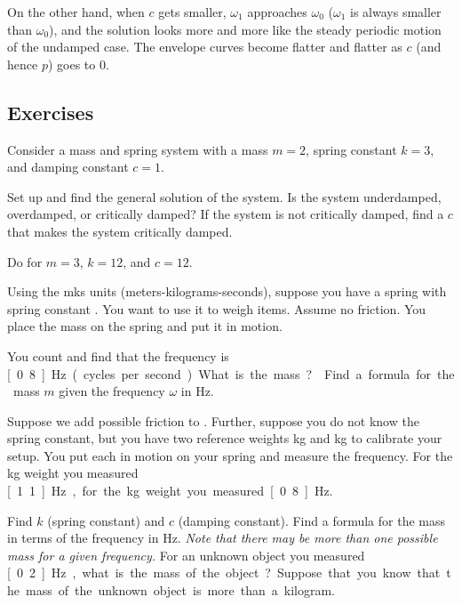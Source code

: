 On the other hand, when $c$ gets smaller, $\omega_1$ approaches $\omega_0$
($\omega_1$ is always smaller than $\omega_0$), and the solution looks more and more like the steady
periodic motion of the undamped case.  The envelope curves become flatter and
flatter as $c$ (and hence $p$) goes to $0$.

\subsection{Exercises}

\begin{samepage}
\begin{exercise} \label{mv:ex1}
Consider a mass and spring system with a mass $m=2$, spring constant $k=3$, and
damping constant $c=1$.
\begin{tasks}
\task Set up and find the general solution of the system.
\task Is the system underdamped, overdamped, or critically damped?
\task If the system is not critically damped, find a $c$ that makes the system
critically damped.
\end{tasks}
\end{exercise}
\end{samepage}

\begin{exercise}
Do  for
$m=3$, $k=12$, and $c=12$.
\end{exercise}

\begin{exercise} \label{mv:exwt1}
Using the mks units (meters-kilograms-seconds),
suppose you have a spring with spring constant .
You want to use
it to weigh items.  Assume no friction.  You place the mass on
the spring and put it in motion.
\begin{tasks}
\task You count and find that the frequency is
\unit[0.8]{Hz} (cycles per second).  What is the mass?
\task Find a formula for the mass $m$
given the frequency $\omega$ in \unit{Hz}.
\end{tasks}
\end{exercise}

\begin{exercise}
Suppose we add possible friction to .
Further, suppose you do not know the spring constant, but you have
two reference weights \unit[1]{kg} and \unit[2]{kg} to calibrate your setup.
You put each in motion on your spring and measure the
frequency.  For the \unit[1]{kg}
weight you measured \unit[1.1]{Hz}, for the \unit[2]{kg} weight you
measured \unit[0.8]{Hz}.
\begin{tasks}
\task Find $k$ (spring constant) and $c$ (damping constant).
\task Find a formula for the mass in terms of the frequency in Hz.  \emph{Note that
there may be more than one possible mass for a given frequency.}
\task For an unknown object you measured \unit[0.2]{Hz}, what is the mass of the
object?  Suppose that you know that the mass of the unknown object
is more than a kilogram.
\end{tasks}
\end{exercise}

